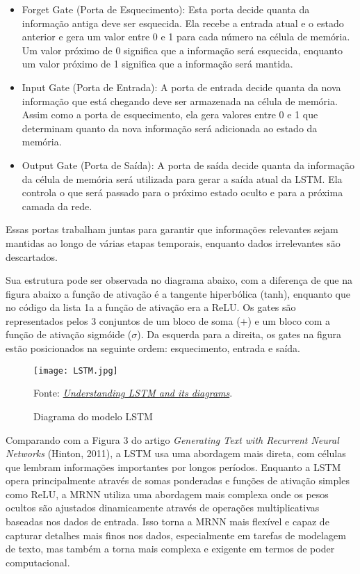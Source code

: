 \documentclass[12 pt]{article}
\begin{document}
\begin{itemize}
    \item Forget Gate (Porta de Esquecimento): Esta porta decide quanta da informação antiga deve ser esquecida. Ela recebe a entrada atual e o estado anterior e gera um valor entre 0 e 1 para cada número na célula de memória. Um valor próximo de 0 significa que a informação será esquecida, enquanto um valor próximo de 1 significa que a informação será mantida.
    \item Input Gate (Porta de Entrada): A porta de entrada decide quanta da nova informação que está chegando deve ser armazenada na célula de memória. Assim como a porta de esquecimento, ela gera valores entre 0 e 1 que determinam quanto da nova informação será adicionada ao estado da memória.
    \item Output Gate (Porta de Saída): A porta de saída decide quanta da informação da célula de memória será utilizada para gerar a saída atual da LSTM. Ela controla o que será passado para o próximo estado oculto e para a próxima camada da rede.
\end{itemize}

Essas portas trabalham juntas para garantir que informações relevantes sejam mantidas ao longo de várias etapas temporais, enquanto dados irrelevantes são descartados.

Sua estrutura pode ser observada no diagrama abaixo, com a diferença de que na figura abaixo a função de ativação é a tangente hiperbólica (tanh), enquanto que no código da lista 1a a função de ativação era a ReLU. Os gates são representados pelos 3 conjuntos de um bloco de soma ($+$) e um bloco com a função de ativação sigmóide ($\sigma$). Da esquerda para a direita, os gates na figura estão posicionados na seguinte ordem: esquecimento, entrada e saída. 

\begin{figure}[H]
    \caption{Diagrama do modelo LSTM}
    \centering
    \texttt{[image: LSTM.jpg]}
    \small

    Fonte: \href{https://blog.mlreview.com/understanding-lstm-and-its-diagrams-37e2f46f1714}{\textit{Understanding LSTM and its diagrams}}.
\end{figure}

Comparando com a Figura 3 do artigo \textit{Generating Text with Recurrent Neural Networks} (Hinton, 2011), a LSTM usa uma abordagem mais direta, com células que lembram informações importantes por longos períodos. Enquanto a LSTM opera principalmente através de somas ponderadas e funções de ativação simples como ReLU, a MRNN utiliza uma abordagem mais complexa onde os pesos ocultos são ajustados dinamicamente através de operações multiplicativas baseadas nos dados de entrada. Isso torna a MRNN mais flexível e capaz de capturar detalhes mais finos nos dados, especialmente em tarefas de modelagem de texto, mas também a torna mais complexa e exigente em termos de poder computacional.
\end{document}

